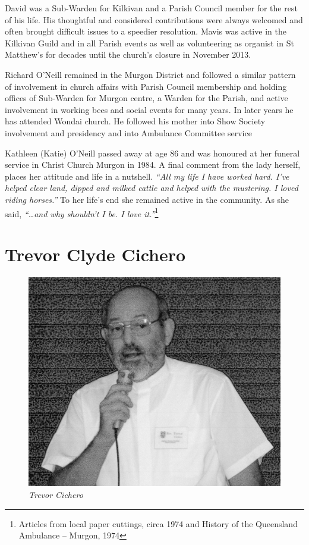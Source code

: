 David was a Sub-Warden for Kilkivan and a Parish Council member for the rest of his life. His thoughtful and considered contributions were always welcomed and often brought difficult issues to a speedier resolution. Mavis was active in the Kilkivan Guild and in all Parish events as well as volunteering as organist in St Matthew's for decades until the church's closure in November 2013.



Richard O'Neill remained in the Murgon District and followed a similar pattern of involvement in church affairs with Parish Council membership and holding offices of Sub-Warden for Murgon centre, a Warden for the Parish, and active involvement in working bees and social events for many years. In later years he has attended Wondai church. He followed his mother into Show Society involvement and presidency and into Ambulance Committee service



Kathleen (Katie) O'Neill passed away at age 86 and was honoured at her funeral service in Christ Church Murgon in 1984. A final comment from the lady herself, places her attitude and life in a nutshell. \emph{``All my life I have worked hard. I've helped clear land, dipped and milked cattle and helped with the mustering. I loved riding horses.''} To her life's end she remained active in the community. As she said, \emph{``\ldots and why shouldn't I be. I love it.''}\footnote{Articles from local paper cuttings, circa 1974 and History of the Queensland Ambulance -- Murgon, 1974}


\section{Trevor Clyde Cichero}









\begin{figure}
\begin{center}
\includegraphics[width=.7\linewidth,center]{../images/TrevorChicero.jpg}
\caption{\itshape Trevor Cichero}
\end{center}
\end{figure}




